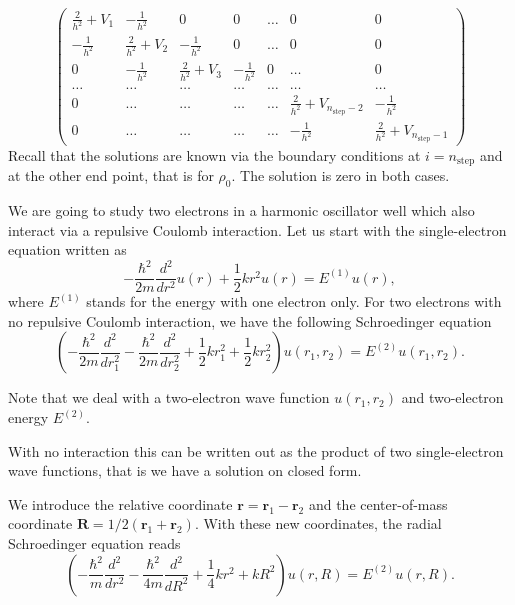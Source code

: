 \documentclass[%
oneside,                 %
final,                   %
10pt]{article}
\begin{document}
\begin{equation}
    \left( \begin{array}{ccccccc} \frac{2}{h^2}+V_1 & -\frac{1}{h^2} & 0   & 0    & \dots  &0     & 0 \\
                                -\frac{1}{h^2} & \frac{2}{h^2}+V_2 & -\frac{1}{h^2} & 0    & \dots  &0     &0 \\
                                0   & -\frac{1}{h^2} & \frac{2}{h^2}+V_3 & -\frac{1}{h^2}  &0       &\dots & 0\\
                                \dots  & \dots & \dots & \dots  &\dots      &\dots & \dots\\
                                0   & \dots & \dots & \dots  &\dots       &\frac{2}{h^2}+V_{n_{\mathrm{step}}-2} & -\frac{1}{h^2}\\
                                0   & \dots & \dots & \dots  &\dots       &-\frac{1}{h^2} & \frac{2}{h^2}+V_{n_{\mathrm{step}}-1}
             \end{array} \right)  
\label{eq:matrixse} 
\end{equation} 
Recall that the solutions are known via the boundary conditions at
$i=n_{\mathrm{step}}$ and at the other end point, that is for  $\rho_0$.
The solution is zero in both cases.

We are going to study two electrons in a harmonic oscillator well which
also interact via a repulsive Coulomb interaction.
Let us start with the single-electron equation written as
\[
  -\frac{\hbar^2}{2 m} \frac{d^2}{dr^2} u(r) 
       + \frac{1}{2}k r^2u(r)  = E^{(1)} u(r),
\]
where $E^{(1)}$ stands for the energy with one electron only.
For two electrons with no repulsive Coulomb interaction, we have the following 
Schroedinger equation
\[
\left(  -\frac{\hbar^2}{2 m} \frac{d^2}{dr_1^2} -\frac{\hbar^2}{2 m} \frac{d^2}{dr_2^2}+ \frac{1}{2}k r_1^2+ \frac{1}{2}k r_2^2\right)u(r_1,r_2)  = E^{(2)} u(r_1,r_2) .
\]

Note that we deal with a two-electron wave function $u(r_1,r_2)$ and 
two-electron energy $E^{(2)}$.

With no interaction this can be written out as the product of two
single-electron wave functions, that is we have a solution on closed form.

We introduce the relative coordinate $\mathbf{r} = \mathbf{r}_1-\mathbf{r}_2$
and the center-of-mass coordinate $\mathbf{R} = 1/2(\mathbf{r}_1+\mathbf{r}_2)$.
With these new coordinates, the radial Schroedinger equation reads
\[
\left(  -\frac{\hbar^2}{m} \frac{d^2}{dr^2} -\frac{\hbar^2}{4 m} \frac{d^2}{dR^2}+ \frac{1}{4} k r^2+  kR^2\right)u(r,R)  = E^{(2)} u(r,R).
\]
\end{document}
